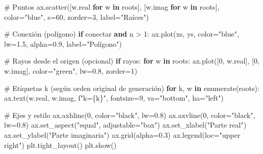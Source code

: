 \documentclass[
  letterpaper,
  DIV=11,
  numbers=noendperiod]{scrreprt}
\newenvironment{Shaded}{\begin{snugshade}}{\end{snugshade}}
\newcommand{\BuiltInTok}[1]{\textcolor[rgb]{0.00,0.23,0.31}{#1}}
\newcommand{\CommentTok}[1]{\textcolor[rgb]{0.37,0.37,0.37}{#1}}
\newcommand{\ControlFlowTok}[1]{\textcolor[rgb]{0.00,0.23,0.31}{\textbf{#1}}}
\newcommand{\DecValTok}[1]{\textcolor[rgb]{0.68,0.00,0.00}{#1}}
\newcommand{\FloatTok}[1]{\textcolor[rgb]{0.68,0.00,0.00}{#1}}
\newcommand{\KeywordTok}[1]{\textcolor[rgb]{0.00,0.23,0.31}{\textbf{#1}}}
\newcommand{\NormalTok}[1]{\textcolor[rgb]{0.00,0.23,0.31}{#1}}
\newcommand{\OperatorTok}[1]{\textcolor[rgb]{0.37,0.37,0.37}{#1}}
\newcommand{\SpecialCharTok}[1]{\textcolor[rgb]{0.37,0.37,0.37}{#1}}
\newcommand{\SpecialStringTok}[1]{\textcolor[rgb]{0.13,0.47,0.30}{#1}}
\newcommand{\StringTok}[1]{\textcolor[rgb]{0.13,0.47,0.30}{#1}}
\begin{document}
\begin{Shaded}
\begin{Highlighting}[]
    \CommentTok{\# Puntos}
\NormalTok{    ax.scatter([w.real }\ControlFlowTok{for}\NormalTok{ w }\KeywordTok{in}\NormalTok{ roots], [w.imag }\ControlFlowTok{for}\NormalTok{ w }\KeywordTok{in}\NormalTok{ roots],}
\NormalTok{               color}\OperatorTok{=}\StringTok{"blue"}\NormalTok{, s}\OperatorTok{=}\DecValTok{60}\NormalTok{, zorder}\OperatorTok{=}\DecValTok{3}\NormalTok{, label}\OperatorTok{=}\StringTok{"Raíces"}\NormalTok{)}

    \CommentTok{\# Conexión (polígono)}
    \ControlFlowTok{if}\NormalTok{ conectar }\KeywordTok{and}\NormalTok{ n }\OperatorTok{\textgreater{}} \DecValTok{1}\NormalTok{:}
\NormalTok{        ax.plot(xs, ys, color}\OperatorTok{=}\StringTok{"blue"}\NormalTok{, lw}\OperatorTok{=}\FloatTok{1.5}\NormalTok{, alpha}\OperatorTok{=}\FloatTok{0.9}\NormalTok{, label}\OperatorTok{=}\StringTok{"Polígono"}\NormalTok{)}

    \CommentTok{\# Rayos desde el origen (opcional)}
    \ControlFlowTok{if}\NormalTok{ rayos:}
        \ControlFlowTok{for}\NormalTok{ w }\KeywordTok{in}\NormalTok{ roots:}
\NormalTok{            ax.plot([}\DecValTok{0}\NormalTok{, w.real], [}\DecValTok{0}\NormalTok{, w.imag], color}\OperatorTok{=}\StringTok{"green"}\NormalTok{, lw}\OperatorTok{=}\FloatTok{0.8}\NormalTok{, zorder}\OperatorTok{=}\DecValTok{1}\NormalTok{)}

    \CommentTok{\# Etiquetas k (según orden original de generación)}
    \ControlFlowTok{for}\NormalTok{ k, w }\KeywordTok{in} \BuiltInTok{enumerate}\NormalTok{(roots):}
\NormalTok{        ax.text(w.real, w.imag, }\SpecialStringTok{f"k=}\SpecialCharTok{\{}\NormalTok{k}\SpecialCharTok{\}}\SpecialStringTok{"}\NormalTok{, fontsize}\OperatorTok{=}\DecValTok{9}\NormalTok{, va}\OperatorTok{=}\StringTok{"bottom"}\NormalTok{, ha}\OperatorTok{=}\StringTok{"left"}\NormalTok{)}

    \CommentTok{\# Ejes y estilo}
\NormalTok{    ax.axhline(}\DecValTok{0}\NormalTok{, color}\OperatorTok{=}\StringTok{"black"}\NormalTok{, lw}\OperatorTok{=}\FloatTok{0.8}\NormalTok{)}
\NormalTok{    ax.axvline(}\DecValTok{0}\NormalTok{, color}\OperatorTok{=}\StringTok{"black"}\NormalTok{, lw}\OperatorTok{=}\FloatTok{0.8}\NormalTok{)}
\NormalTok{    ax.set\_aspect(}\StringTok{"equal"}\NormalTok{, adjustable}\OperatorTok{=}\StringTok{"box"}\NormalTok{)}
\NormalTok{    ax.set\_xlabel(}\StringTok{"Parte real"}\NormalTok{)}
\NormalTok{    ax.set\_ylabel(}\StringTok{"Parte imaginaria"}\NormalTok{)}
\NormalTok{    ax.grid(alpha}\OperatorTok{=}\FloatTok{0.3}\NormalTok{)}
\NormalTok{    ax.legend(loc}\OperatorTok{=}\StringTok{"upper right"}\NormalTok{)}
\NormalTok{    plt.tight\_layout()}
\NormalTok{    plt.show()}


\end{Highlighting}
\end{Shaded}
\end{document}
